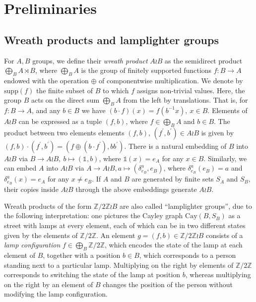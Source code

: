\documentclass[reqno,oneside,11pt]{amsart}
\newcommand{\cay}[2]{\mathrm{Cay}(#1,#2)}
\newcommand{\Z}{\mathbb{Z}}
\newcommand{\supp}[1]{\mathrm{supp}(#1)}
\theoremstyle{plain}
\theoremstyle{definition}
\begin{document}
\section{Preliminaries}\label{section: preliminaries}
\subsection{Wreath products and lamplighter groups}
For $A,B$ groups, we define their \textit{wreath product} $A\wr B$ as the semidirect product $\bigoplus_{B} A \rtimes B$, where $\bigoplus_{B} A $ is the group of finitely supported functions $f:B\to A$ endowed  with the operation $\oplus$ of componentwise multiplication. We denote by $\supp{f}$ the finite subset of $B$ to which $f$ assigns non-trivial values. Here, the group $B$ acts on the direct sum $\bigoplus_{B} A $ from the left by translations. That is, for $f:B\to A$, and any $b\in B$ we have $(b\cdot f)(x)=f(b^{-1}x), \ x\in B.$ Elements of $A\wr B$ can be expressed as a tuple $(f,b)$, where $f\in \bigoplus_{B} A$ and $b\in B$. The product between two elements elements $(f,b)$, $(f^{\prime},b^{\prime})\in A\wr B$ is given by $(f,b)\cdot(f^{\prime},b^{\prime})= (f\oplus (b\cdot f^{\prime}),bb^{\prime}).$ There is a natural embedding of $B$ into $A\wr B$ via $B\to A\wr B,\ b\mapsto (\mathds{1},b)$, where $\mathds{1}(x)=e_A$ for any $x\in B$. Similarly, we can embed $A$ into $A\wr B$ via $A\to A\wr B, a\mapsto (\delta^{a}_{e_B},e_B)$, where $\delta^{a}_{e_B}(e_B)=a$ and $\delta^{a}_{e_B}(x)=e_A$ for any $x\neq e_B$. If $A$ and $B$ are generated by finite sets $S_A$ and $S_B$, their copies inside $A\wr B$ through the above embeddings generate $A\wr B$.

Wreath products of the form $\Z/2\Z\wr B$ are also called ``lamplighter groups'', due to the following interpretation: one pictures the Cayley graph $\cay{B}{S_B}$ as a street with lamps at every element, each of which can be in two different states given by the elements of $\Z/2\Z$. An element $g=(f,b)\in \Z/2\Z\wr B$ consists of a \emph{lamp configuration} $f\in \bigoplus_{B} \Z/2\Z$, which encodes the state of the lamp at each element of $B$, together with a position $b\in B$, which corresponds to a person standing next to a particular lamp. Multiplying on the right by elements of $\Z/2\Z$ corresponds to switching the state of the lamp at position $b$, whereas multiplying on the right by an element of $B$ changes the position of the person without modifying the lamp configuration.
\end{document}
